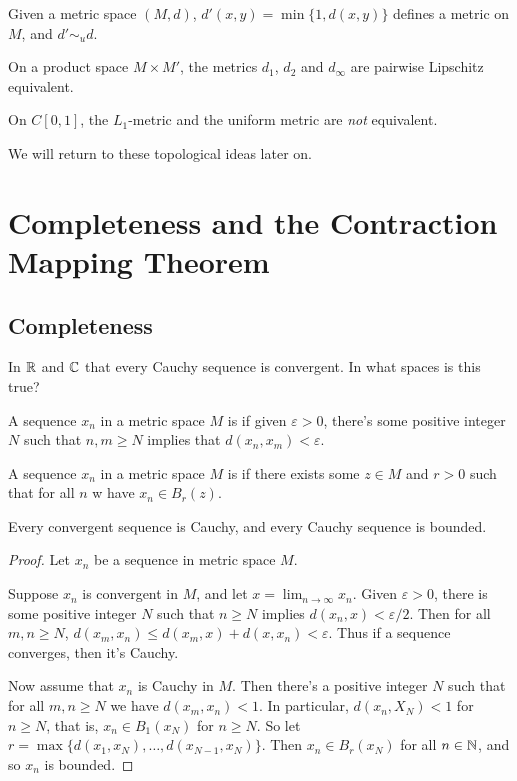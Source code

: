 \documentclass[a4paper]{scrartcl}
\begin{document}
\begin{example}
    Given a metric space $(M, d)$, $d'(x, y) = \min\{1, d(x, y)\}$ defines a metric on $M$, and $d' \sim_u d$.
\end{example}

\begin{example}
    On a product space $M \times M'$, the metrics $d_1$, $d_2$ and $d_{\infty}$ are pairwise Lipschitz equivalent.
\end{example}

\begin{example}
    On $C[0, 1]$, the $L_1$-metric and the uniform metric are \emph{not} equivalent.
\end{example}

We will return to these topological ideas later on.

\section{Completeness and the Contraction Mapping Theorem}

\subsection{Completeness}

In $\mathbb{R}$ and $\mathbb{C}$ that every Cauchy sequence is convergent. In what spaces is this true?

\begin{definition}
    A sequence $x_n$ in a metric space $M$ is  if given $\varepsilon > 0$, there's some positive integer $N$ such that $n, m \geq N$ implies that $d(x_n, x_m) < \varepsilon$.
\end{definition}

\begin{definition}[Bounded]
    A sequence $x_n$ in a metric space $M$ is  if there exists some $z \in M$ and $r > 0$ such that for all $n$ w have $x_n \in B_r(z)$.
\end{definition}

\begin{lemma}
    Every convergent sequence is Cauchy, and every Cauchy sequence is bounded.
\end{lemma}
\begin{proof}
    Let $x_n$ be a sequence in metric space $M$. 
    
    Suppose $x_n$ is convergent in $M$, and let $x = \lim_{n \to \infty} x_n$.
    Given $\varepsilon > 0$, there is some positive integer $N$ such that $n \geq N$ implies $d(x_n, x) < \varepsilon/2$.
    Then for all $m, n \geq N$, $d(x_m, x_n) \leq d(x_m, x) + d(x, x_n) < \varepsilon$. Thus if a sequence converges, then it's Cauchy.

    Now assume that $x_n$ is Cauchy in $M$. Then there's a positive integer $N$ such that for all $m, n \geq N$ we have $d(x_m, x_n) < 1$. In particular, $d(x_n, X_N) < 1$ for $n \geq N$, that is, $x_n \in B_1(x_N)$ for $n \geq N$.
    So let $r = \max\{d(x_1, x_N), \dots, d(x_{N - 1}, x_N)\}$. Then $x_n \in B_r(x_N)$ for all $n \in \mathbb{N}$, and so $x_n$ is bounded.
\end{proof}
\end{document}
